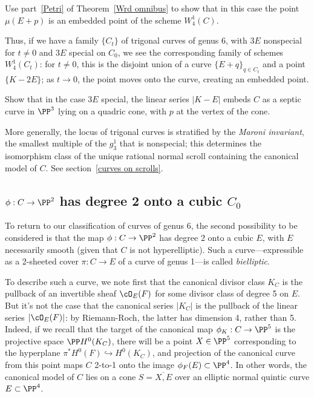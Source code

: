 \begin{exercise}
Use part~\ref{Petri} of Theorem~\ref{Wrd omnibus} to show that in this case the point $\mu(E+p)$ is an embedded point of the scheme $W^1_4(C)$.
\end{exercise} 

Thus, if we have a family $\{C_t\}$ of trigonal curves of genus 6, with $3E$ nonspecial for $t \neq 0$ and $3E$ special on $C_0$, we see the corresponding family of schemes $W^1_4(C_t)$: for $t \neq 0$, this is the disjoint union of a curve $\{E+q\}_{q \in C_t}$ and a point $\{K-2E\}$; as $t \to 0$, the point moves onto the curve, creating an embedded point.

\begin{exercise}
Show that in the case $3E$ special, the linear series $|K-E|$ embeds $C$ as a septic curve in $\PP^3$ lying on a quadric cone, with $p$ at the vertex of the cone.
\end{exercise}

More generally, the locus of trigonal curves is stratified by  the \emph{Maroni invariant}, the smallest multiple  of the $g^1_3$ that is nonspecial; this determines the isomorphism class of the unique rational normal scroll containing the canonical model of $C$. See section~\ref{curves on scrolls}. 

\subsection{$\phi : C \to \PP^2$ has degree 2 onto a cubic $C_0$}

To return to our classification of curves of genus 6, the second possibility to be considered is that the map $\phi : C \to \PP^2$ has degree 2 onto a cubic $E$, with $E$ necessarily smooth (given that $C$ is not hyperelliptic). Such a curve---expressible as a 2-sheeted cover $\pi : C \to E$ of a curve of genus 1---is called \emph{bielliptic}.

To describe such a curve, we note first that the canonical divisor class $K_C$ is the pullback of an invertible sheaf $\cO_E(F)$ for some divisor class of degree 5 on $E$. But it's not the case that the canonical series $|K_C|$ is the pullback of the linear series $|\cO_E(F)|$: by Riemann-Roch, the latter has dimension 4, rather than 5. Indeed, if we recall that the target of the canonical map $\phi_K : C \to \PP^5$ is the projective space $\PP H^0(K_C)$, there will be a point $X \in \PP^5$ corresponding to the hyperplane $\pi^*H^0(F) \hookrightarrow H^0(K_C)$, and projection of the canonical curve from this point maps $C$ 2-to-1 onto the image $\phi_F(E) \subset \PP^4$. In other words, the canonical model of $C$ lies on a cone $S = \overline{X, E}$ over an elliptic normal quintic curve $E \subset \PP^4$.

